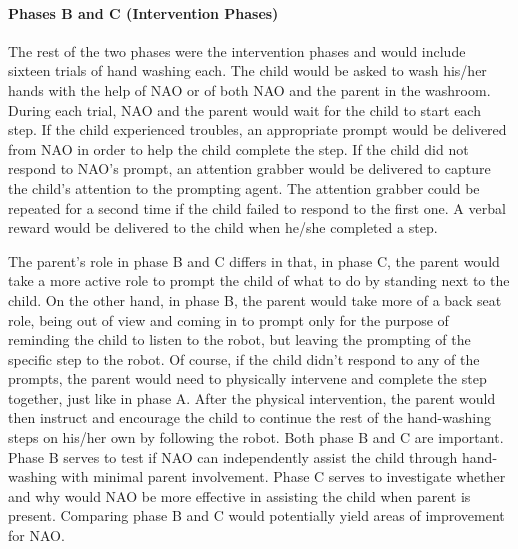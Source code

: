 \paragraph{Phases B and C (Intervention Phases)}
The rest of the two phases were the intervention phases and would include sixteen trials of hand washing each. The child would be asked to wash his/her hands with the help of NAO or of both NAO and the parent in the washroom. During each trial, NAO and the parent would wait for the child to start each step. If the child experienced troubles, an appropriate prompt would be delivered from NAO in order to help the child complete the step. If the child did not respond to NAO's prompt, an attention grabber would be delivered to capture the child's attention to the prompting agent. The attention grabber could be repeated for a second time if the child failed to respond to the first one.  A verbal reward would be delivered to the child when he/she completed a step.

The parent's role in phase B and C differs in that, in phase C, the parent would take a more active role to prompt the child of what to do by standing next to the child.  On the other hand, in phase B, the parent would take more of a back seat role, being out of view and coming in to prompt only for the purpose of reminding the child to listen to the robot, but leaving the prompting of the specific step to the robot.  Of course, if the child didn't respond to any of the prompts, the parent would need to physically intervene and complete the step together, just like in phase A.  After the physical intervention, the parent would then instruct and encourage the child to continue the rest of the hand-washing steps on his/her own by following the robot.  Both phase B and C are important.  Phase B serves to test if NAO can independently assist the child through hand-washing with minimal parent involvement.  Phase C serves to investigate whether and why would NAO be more effective in assisting the child when parent is present.  Comparing phase B and C would potentially yield areas of improvement for NAO.


